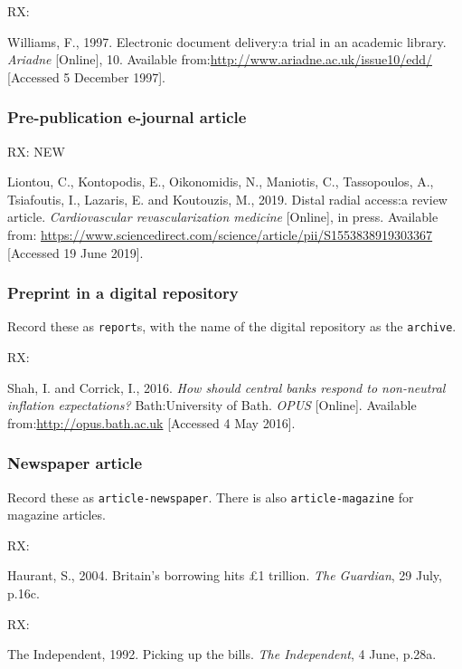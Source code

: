 RX: \cite{williams1997edd}

Williams, F., 1997. Electronic document delivery:\@ a trial in an academic library. \emph{Ariadne} [Online], 10. Available from:\@ \url{http://www.ariadne.ac.uk/issue10/edd/} [Accessed 5 December 1997].



\subsubsection*{Pre-publication e-journal article}

RX: \cite{liontou.etal2019dra} NEW

Liontou, C., Kontopodis, E., Oikonomidis, N., Maniotis, C., Tassopoulos, A., Tsiafoutis, I., Lazaris, E. and Koutouzis, M., 2019. Distal radial access:\@ a review article. \emph{Cardiovascular revascularization medicine} [Online], in press. Available from: \url{https://www.sciencedirect.com/science/article/pii/S1553838919303367} [Accessed 19 June 2019].



\subsubsection*{Preprint in a digital repository}

Record these as \texttt{report}s, with the name of the digital repository as the \texttt{archive}.

RX: \cite{shah.corrick2016hsc}

Shah, I. and Corrick, I., 2016. \emph{How should central banks respond to non-neutral inflation expectations?} Bath:\@ University of Bath. \emph{OPUS} [Online]. Available from:\@ \url{http://opus.bath.ac.uk} [Accessed 4 May 2016].



\subsubsection*{Newspaper article}

Record these as \texttt{article-newspaper}. There is also \texttt{article-magazine} for magazine articles.

RX: \cite{haurant2004bbh}

Haurant, S., 2004. Britain's borrowing hits £1 trillion. \emph{The Guardian}, 29 July, p.16c.


RX: \cite{independent1992pub}

The Independent, 1992. Picking up the bills. \emph{The Independent}, 4 June, p.28a.



